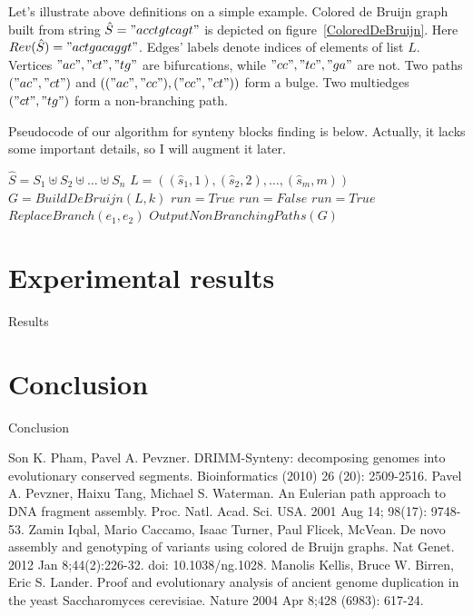 \documentclass[a4paper,12pt]{scrartcl}
\begin{document}
Let's illustrate above definitions on a simple example. Colored de Bruijn graph built from string \(\hat{S} = "acctgtcagt"\)
is depicted on figure~\ref{ColoredDeBruijn}. Here \(Rev(\hat{S}) = "actgacaggt"\). Edges' labels denote indices of elements of
list \(L\). Vertices \("ac", "ct", "tg"\) are bifurcations, while \("cc", "tc", "ga"\) are not. Two paths \(("ac", "ct")\) and \((("ac", "cc"), ("cc", "ct"))\)
form a bulge. Two multiedges \(("ct", "tg")\) form a non-branching path.

Pseudocode of our algorithm for synteny blocks finding is below. Actually, it lacks some important details, so I will augment it later.

\begin{algorithm}[H]               
\small \caption*{\(SyntenyFinder(S = \lbrace S_{1}, S_{2}, \ldots, S_{n} \rbrace,  k, \delta)\)} 
\label{Pseudocode}
\begin{algorithmic}[1]     
\State \(\hat{S} = S_{1} \uplus S_{2} \uplus \ldots \uplus S_{n} \)
\State \(L = ((\hat{s}_1, 1), (\hat{s}_2, 2), \ldots, (\hat{s}_{m}, m))\)
\State \(G = BuildDeBruijn(L, k)\)
\State \(run = True\)
	\State \(run = False\)
				\State \(run = True\)
				\State \(ReplaceBranch(e_1, e_2)\)
			\EndIf
		\EndFor
	\EndFor
\EndWhile
\State \(OutputNonBranchingPaths(G)\)
\end{algorithmic}
\end{algorithm}

\section{Experimental results}
Results
\section{Conclusion}
Conclusion

\begin{thebibliography}{9}
	Son K. Pham, Pavel A. Pevzner.
	DRIMM-Synteny: decomposing genomes into evolutionary conserved segments.
	Bioinformatics (2010)  26  (20):  2509-2516.
	Pavel A. Pevzner, Haixu Tang, Michael S. Waterman.
	An Eulerian path approach to DNA fragment assembly.
	Proc. Natl. Acad. Sci. USA. 2001 Aug 14; 98(17): 9748-53.
	Zamin Iqbal, Mario Caccamo, Isaac Turner, Paul Flicek, McVean.
	De novo assembly and genotyping of variants using colored de Bruijn graphs.
	Nat Genet. 2012 Jan 8;44(2):226-32. doi: 10.1038/ng.1028.
	Manolis Kellis, Bruce W. Birren, Eric S. Lander.
	Proof and evolutionary analysis of ancient genome duplication in the yeast Saccharomyces cerevisiae.
	Nature 2004 Apr 8;428 (6983): 617-24.
\end{thebibliography}
\end{document}
